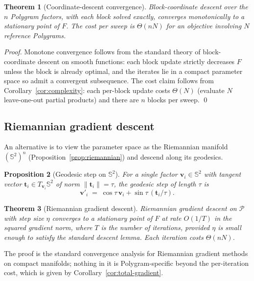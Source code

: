\documentclass[11pt,letterpaper]{article}
\newtheorem{theorem}{Theorem}[section]
\newtheorem{proposition}[theorem]{Proposition}
\theoremstyle{definition}
\newcommand{\Sphere}{\mathbb{S}}
\newcommand{\Polygram}{\mathcal{P}}
\newcommand{\norm}[1]{\lVert #1 \rVert}
\begin{document}
\begin{theorem}[Coordinate-descent convergence]
\label{thm:cd-converge}
Block-coordinate descent over the $n$ Polygram factors, with each block solved
exactly, converges monotonically to a stationary point of $F$. The cost per
sweep is $\Theta(n N)$ for an objective involving $N$ reference Polygrams.
\end{theorem}
\begin{proof}
Monotone convergence follows from the standard theory of block-coordinate
descent on smooth functions: each block update strictly decreases $F$ unless
the block is already optimal, and the iterates lie in a compact parameter
space so admit a convergent subsequence. The cost claim follows from
Corollary~\ref{cor:complexity}: each per-block update costs $\Theta(N)$
(evaluate $N$ leave-one-out partial products) and there are $n$ blocks per
sweep. \qed
\end{proof}

\subsection{Riemannian gradient descent}

An alternative is to view the parameter space as the Riemannian manifold
$(\Sphere^{2})^{n}$ (Proposition~\ref{prop:riemannian}) and descend along
its geodesics.

\begin{proposition}[Geodesic step on $\Sphere^{2}$]
For a single factor $\bm{v}_{i} \in \Sphere^{2}$ with tangent vector
$\bm{t}_{i} \in T_{\bm{v}_{i}} \Sphere^{2}$ of norm $\norm{\bm{t}_{i}} = \tau$,
the geodesic step of length $\tau$ is
\[
\bm{v}'_{i} \;=\; \cos\tau\, \bm{v}_{i} + \sin\tau\, (\bm{t}_{i} / \tau).
\]
\end{proposition}

\begin{theorem}[Riemannian gradient descent]
\label{thm:riem-gd}
Riemannian gradient descent on $\Polygram$ with step size $\eta$ converges
to a stationary point of $F$ at rate $O(1/T)$ in the squared gradient norm,
where $T$ is the number of iterations, provided $\eta$ is small enough to
satisfy the standard descent lemma. Each iteration costs $\Theta(n N)$.
\end{theorem}

The proof is the standard convergence analysis for Riemannian gradient
methods on compact manifolds; nothing in it is Polygram-specific beyond the
per-iteration cost, which is given by Corollary~\ref{cor:total-gradient}.
\end{document}
